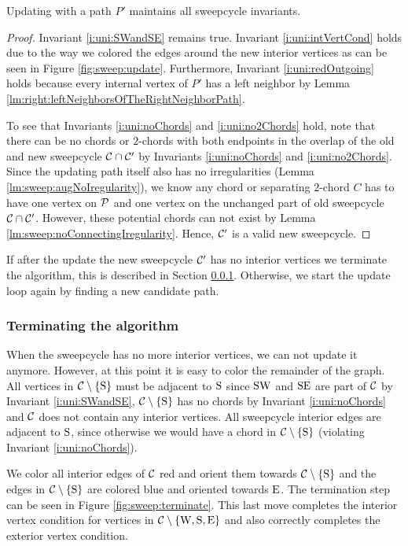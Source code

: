   \begin{lemma}
    \label{lm:sweep:updateMaintainsInvariants}
    Updating with a path $P'$ maintains all sweepcycle invariants.
  \end{lemma}
  \begin{proof}
    Invariant \ref{i:uni:SWandSE} remains true. Invariant \ref{i:uni:intVertCond} holds due to the way we colored the edges around the new interior vertices as can be seen in Figure \ref{fig:sweep:update}.
    Furthermore, Invariant \ref{i:uni:redOutgoing} holds because every internal vertex of $P'$ has a left neighbor by Lemma \ref{lm:right:leftNeighborsOfTheRightNeighborPath}.

    To see that Invariants \ref{i:uni:noChords} and \ref{i:uni:no2Chords} hold, note that there can be no chords or $2$-chords with both endpoints in the overlap of the old and new sweepcycle $\C \cap \C'$ by Invariants \ref{i:uni:noChords} and \ref{i:uni:no2Chords}.
     Since the updating path itself also has no irregularities (Lemma \ref{lm:sweep:augNoIregularity}),
    we know any chord or separating $2$-chord $C$ has to have one vertex on $\P$ and one vertex on the unchanged part of old sweepcycle $\C \cap \C'$.
    However, these potential chords can not exist by Lemma \ref{lm:sweep:noConnectingIregularity}.
    Hence, $\C'$ is a valid new sweepcycle.
  \end{proof}

  If after the update the new sweepcycle $\C'$ has no interior vertices we terminate the algorithm,  this is described in Section \ref{sss:terminating}.
  Otherwise, we start the update loop again by finding a new candidate path.

\subsubsection{Terminating the algorithm}
  \label{sss:terminating}
  When the sweepcycle has no more interior vertices, we can not update it anymore.
  However, at this point it is easy to color the remainder of the graph.
  All vertices in $\cpath$ must be adjacent to $\pS$ since $\pS \pW$ and $\pS \pE$ are part of $\C$ by Invariant \ref{i:uni:SWandSE}, $\cpath$ has no chords by Invariant \ref{i:uni:noChords} and $\C$ does not contain any interior vertices.
  All sweepcycle interior edges are adjacent to $\pS$, since otherwise we would have a chord in $\cpath$ (violating Invariant \ref{i:uni:noChords}).

  We color all interior edges of $\C$ red and orient them towards $\cpath$ and the edges in $\cpath$ are colored blue and oriented towards $\pE$. The termination step can be seen in Figure \ref{fig:sweep:terminate}. This last move completes the interior vertex condition for vertices in $\C \sm {\pW, \pS, \pE}$ and also correctly completes the exterior vertex condition.


